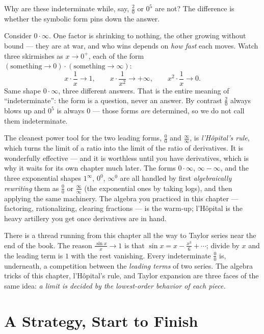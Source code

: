Why are these indeterminate while, say, $\frac{2}{0}$ or $0^{5}$ are not? The
difference is whether the symbolic form pins down the answer.

\begin{intuitionbox}
Consider $0\cdot\infty$. One factor is shrinking to nothing, the other growing
without bound --- they are at war, and who wins depends on \emph{how fast} each
moves. Watch three skirmishes as $x\to 0^{+}$, each of the form
$(\text{something}\to 0)\cdot(\text{something}\to\infty)$:
\[
  x\cdot\frac1x \to 1,
  \qquad
  x\cdot\frac{1}{x^{2}} \to +\infty,
  \qquad
  x^{2}\cdot\frac1x \to 0.
\]
Same shape $0\cdot\infty$, three different answers. That is the entire meaning
of ``indeterminate'': the form is a question, never an answer. By contrast
$\frac{2}{0}$ always blows up and $0^{5}$ is always $0$ --- those forms
\emph{are} determined, so we do not call them indeterminate.
\end{intuitionbox}

The cleanest power tool for the two leading forms, $\frac00$ and
$\frac{\infty}{\infty}$, is \emph{l'H\^opital's rule}, which turns the limit of
a ratio into the limit of the ratio of derivatives. It is wonderfully
effective --- and it is worthless until you have derivatives, which is why it
waits for its own chapter much later. The forms $0\cdot\infty$,
$\infty-\infty$, and the three exponential shapes $1^\infty$, $0^0$,
$\infty^0$ are all handled by first \emph{algebraically rewriting} them as
$\frac00$ or $\frac{\infty}{\infty}$ (the exponential ones by taking logs), and
then applying the same machinery. The algebra you practiced in this chapter ---
factoring, rationalizing, clearing fractions --- is the warm-up; l'H\^opital is
the heavy artillery you get once derivatives are in hand.

\begin{connectionbox}
There is a thread running from this chapter all the way to Taylor series near
the end of the book. The reason $\frac{\sin x}{x}\to 1$ is that $\sin x = x -
\frac{x^3}{6} + \cdots$; divide by $x$ and the leading term is $1$ with the
rest vanishing. Every indeterminate $\frac00$ is, underneath, a competition
between the \emph{leading terms} of two series. The algebra tricks of this
chapter, l'H\^opital's rule, and Taylor expansion are three faces of the same
idea: \emph{a limit is decided by the lowest-order behavior of each piece.}
\end{connectionbox}

\section{A Strategy, Start to Finish}
\label{ch07:strategy}

